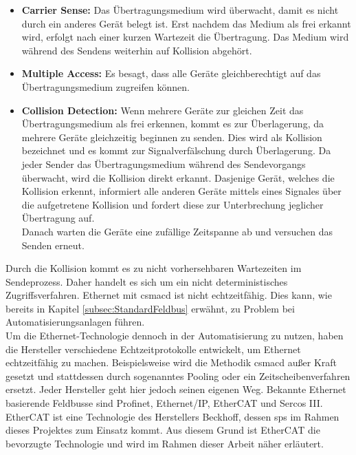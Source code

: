 \documentclass[ a4paper,
                oneside,
                toc=bibliography,
                toc=listof
                ]{scrbook}
\begin{document}
	\begin{itemize}
		\item \textbf{Carrier Sense:} Das Übertragungsmedium wird überwacht, damit es nicht durch ein anderes Gerät belegt ist. Erst nachdem das Medium als frei erkannt wird, erfolgt nach einer kurzen Wartezeit die Übertragung. Das Medium wird während des Sendens weiterhin auf Kollision abgehört.
		\item \textbf{Multiple Access:} Es besagt, dass alle Geräte gleichberechtigt auf das Übertragungsmedium zugreifen können.
		\item \textbf{Collision Detection:} Wenn mehrere Geräte zur gleichen Zeit das Übertragungsmedium als frei erkennen, kommt es zur Überlagerung, da mehrere Geräte gleichzeitig beginnen zu senden. Dies wird als Kollision bezeichnet und es kommt zur Signalverfälschung durch Überlagerung. Da jeder Sender das Übertragungsmedium während des Sendevorgangs überwacht, wird die Kollision direkt erkannt. Dasjenige Gerät, welches die Kollision erkennt, informiert alle anderen Geräte mittels eines Signales über die aufgetretene Kollision und fordert diese zur Unterbrechung jeglicher Übertragung auf. \\
		Danach warten die Geräte eine zufällige Zeitspanne ab und versuchen das Senden erneut. \cite{riggert2002rechnernetze}
	\end{itemize}
	Durch die Kollision kommt es zu nicht vorhersehbaren Wartezeiten im Sendeprozess. Daher handelt es sich um ein nicht deterministisches Zugriffsverfahren. Ethernet mit \acs{csmacd} ist nicht echtzeitfähig. Dies kann, wie bereits in Kapitel \ref{subsec:StandardFeldbus} erwähnt, zu Problem bei Automatisierungsanlagen führen.\\
	Um die Ethernet-Technologie dennoch in der Automatisierung zu nutzen, haben die Hersteller verschiedene Echtzeitprotokolle entwickelt, um Ethernet echtzeitfähig zu machen. Beispielsweise wird die Methodik \acs{csmacd} außer Kraft gesetzt und stattdessen durch sogenanntes \glqq Pooling\grqq{} oder ein Zeitscheibenverfahren ersetzt. Jeder Hersteller geht hier jedoch seinen eigenen Weg.	Bekannte Ethernet basierende Feldbusse sind \glqq Profinet\grqq , \glqq Ethernet/IP\grqq , \glqq EtherCAT\grqq{} und \glqq Sercos III\grqq{}.
	EtherCAT ist eine Technologie des Herstellers \glqq Beckhoff\grqq, dessen \ac{sps} im Rahmen dieses Projektes zum Einsatz kommt. Aus diesem Grund ist EtherCAT die bevorzugte Technologie und wird im Rahmen dieser Arbeit näher erläutert. \cite{ethercat} \cite{riggert2002rechnernetze}\
	\\
\end{document}
